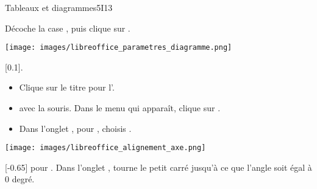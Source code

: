 \begin{EXO}{Tableaux et diagrammes}{5I13}
\begin{tcbenumerate}[1][4]
\begin{MultiColonnes}{3}
Décoche la case , puis clique sur .

    \tcbitem \begin{center}
\texttt{[image: images/libreoffice\_parametres\_diagramme.png]}
\end{center}
\end{MultiColonnes}
\tcbitem {}[0.1]. 

\begin{MultiColonnes}{3}
    \tcbitem[raster multicolumn=2] \begin{itemize}[label=$\bullet$] 
        \item Clique sur le titre pour l'. 
        \item {} avec la souris. Dans le menu qui apparaît, clique sur . 
        \item Dans l'onglet , pour , choisis . 
    \end{itemize}
    \tcbitem \begin{center}
\texttt{[image: images/libreoffice\_alignement\_axe.png]}
\end{center}
\end{MultiColonnes}
\tcbitem {}[-0.65]  pour . Dans l'onglet , tourne le petit carré jusqu'à ce que l'angle soit égal à 0 degré. 
\end{tcbenumerate}

\end{EXO}